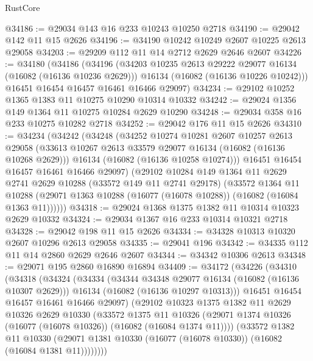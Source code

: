 \begin{lexlean}{RustCore}
\begin{coremodule}
@34186 := @29034 @143 @16 @233 @10243 @10250 @2718
@34190 := @29042 @142 @11 @15 @2626
@34196 := @34190 @10242 @10249 @2607 @10225 @2613 @29058
@34203 := @29209 @112 @11 @14 @2712 @2629 @2646 @2607
@34226 := @34180
    (@34186
      (@34196
        (@34203 @10235 @2613 @29222 @29077 @16134 (@16082 (@16136 @10236 @2629)))
        @16134
        (@16082 (@16136 @10226 @10242)))
      @16451
      @16454
      @16457
      @16461
      @16466
      @29097)
@34234 := @29102 @10252 @1365 @1383 @11 @10275 @10290 @10314 @10332
@34242 := @29024 @1356 @149 @1364 @11 @10275 @10284 @2629 @10290
@34248 := @29034 @358 @16 @233 @10275 @10282 @2718
@34252 := @29042 @176 @11 @15 @2626
@34310 := @34234
    (@34242
      (@34248
        (@34252
          @10274
          @10281
          @2607
          @10257
          @2613
          @29058
          (@33613 @10267 @2613 @33579 @29077 @16134 (@16082 (@16136 @10268 @2629)))
          @16134
          (@16082 (@16136 @10258 @10274)))
        @16451
        @16454
        @16457
        @16461
        @16466
        @29097)
      (@29102
        @10284
        @149
        @1364
        @11
        @2629
        @2741
        @2629
        @10288
        (@33572 @149 @11 @2741 @29178)
        (@33572
          @1364
          @11
          @10288
          (@29071 @1363 @10288 (@16077 (@16078 @10288)) (@16082 (@16084 @1363 @11))))))
@34318 := @29024 @1368 @1375 @1382 @11 @10314 @10323 @2629 @10332
@34324 := @29034 @1367 @16 @233 @10314 @10321 @2718
@34328 := @29042 @198 @11 @15 @2626
@34334 := @34328 @10313 @10320 @2607 @10296 @2613 @29058
@34335 := @29041 @196
@34342 := @34335 @112 @11 @14 @2860 @2629 @2646 @2607
@34344 := @34342 @10306 @2613
@34348 := @29071 @195 @2860 @16890 @16894
@34409 := @34172
    (@34226
      (@34310
        (@34318
          (@34324
            (@34334
              (@34344 @34348 @29077 @16134 (@16082 (@16136 @10307 @2629)))
              @16134
              (@16082 (@16136 @10297 @10313)))
            @16451
            @16454
            @16457
            @16461
            @16466
            @29097)
          (@29102
            @10323
            @1375
            @1382
            @11
            @2629
            @10326
            @2629
            @10330
            (@33572
              @1375
              @11
              @10326
              (@29071 @1374 @10326 (@16077 (@16078 @10326)) (@16082 (@16084 @1374 @11))))
            (@33572
              @1382
              @11
              @10330
              (@29071 @1381 @10330 (@16077 (@16078 @10330)) (@16082 (@16084 @1381 @11))))))))

\end{coremodule}
\end{lexlean}
